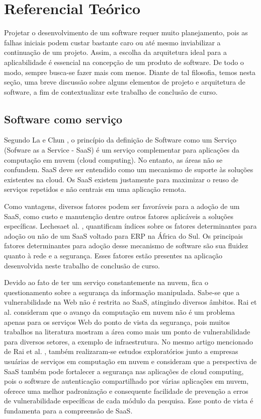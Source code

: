 \chapter{Referencial Teórico}


Projetar o desenvolvimento de um software requer muito planejamento, pois as falhas iniciais podem custar bastante caro ou até mesmo inviabilizar a continuação de um projeto. Assim, a escolha da arquitetura ideal para a aplicabilidade é essencial na concepção de um produto de software. 
De todo o modo, sempre busca-se fazer mais com menos. Diante de tal filosofia, temos nesta seção, uma breve discussão sobre alguns elementos de projeto e arquitetura de software, a fim de contextualizar este trabalho de conclusão de curso.


 \section{Software como serviço}\label{sec:saas}


Segundo La e Chun \citep{La2009Systematic}, o princípio da definição de Software como um Serviço (Sofware as a Service - SaaS) é um serviço complementar para aplicações da computação em nuvem (cloud computing). No entanto, as áreas não se confundem. SaaS deve ser entendido como um mecanismo de suporte às soluções existentes na cloud. Os SaaS existem justamente para maximizar o reuso de serviços repetidos e não centrais em uma aplicação remota.


Como vantagens, diversos fatores podem ser favoráveis para a adoção de um SaaS, como custo e manutenção dentre outros fatores aplicáveis a soluções específicas. Lechesaet al. \citep{LechesaSS11}, quantificam índices sobre os fatores determinantes para adoção ou não de um SaaS voltado para ERP na África do Sul. Os principais fatores determinantes para adoção desse mecanismo de software são sua fluidez quanto à rede e a segurança. Esses fatores estão presentes na aplicação desenvolvida neste trabalho de conclusão de curso.

 

Devido ao fato de ter um serviço constantemente na nuvem, fica o questionamento sobre a segurança da informação manipulada. Sabe-se que a vulnerabilidade na Web não é restrita ao SaaS, atingindo diversos âmbitos. Rai et al. \cite{journals/corr/RaiSM13} consideram que o avanço da computação em nuvem não é um problema apenas para os serviços Web do ponto de vista da segurança, pois muitos trabalhos na literatura mostram a área como mais um ponto de vulnerabilidade para diversos setores, a exemplo de infraestrutura. No mesmo artigo mencionado de Rai et al. \cite{journals/corr/RaiSM13}, também realizaram-se estudos exploratórios junto a empresas usuárias de serviços em computação em nuvem e consideram que a perspectiva de SaaS também pode fortalecer a segurança nas aplicações de cloud computing, pois o software de autenticação compartilhado por várias aplicações em nuvem, oferece uma melhor padronização e consequente facilidade de prevenção a erros de vulnerabilidade específicas de cada módulo da pesquisa. Esse ponto de vista é fundamenta para a compreensão de SaaS.


